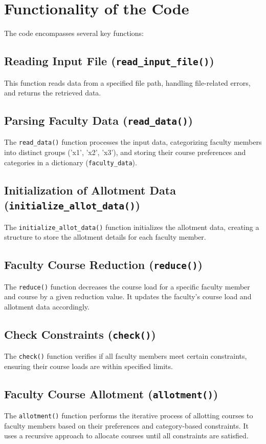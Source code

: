 \documentclass{article}
\begin{document}
\section{Functionality of the Code}

The code encompasses several key functions:

\subsection{Reading Input File (\texttt{read\_input\_file()})}

This function reads data from a specified file path, handling file-related errors, and returns the retrieved data.

\subsection{Parsing Faculty Data (\texttt{read\_data()})}

The \texttt{read\_data()} function processes the input data, categorizing faculty members into distinct groups ('x1', 'x2', 'x3'), and storing their course preferences and categories in a dictionary (\texttt{faculty\_data}).

\subsection{Initialization of Allotment Data (\texttt{initialize\_allot\_data()})}

The \texttt{initialize\_allot\_data()} function initializes the allotment data, creating a structure to store the allotment details for each faculty member.

\subsection{Faculty Course Reduction (\texttt{reduce()})}

The \texttt{reduce()} function decreases the course load for a specific faculty member and course by a given reduction value. It updates the faculty's course load and allotment data accordingly.

\subsection{Check Constraints (\texttt{check()})}

The \texttt{check()} function verifies if all faculty members meet certain constraints, ensuring their course loads are within specified limits.

\subsection{Faculty Course Allotment (\texttt{allotment()})}

The \texttt{allotment()} function performs the iterative process of allotting courses to faculty members based on their preferences and category-based constraints. It uses a recursive approach to allocate courses until all constraints are satisfied.
\end{document}
